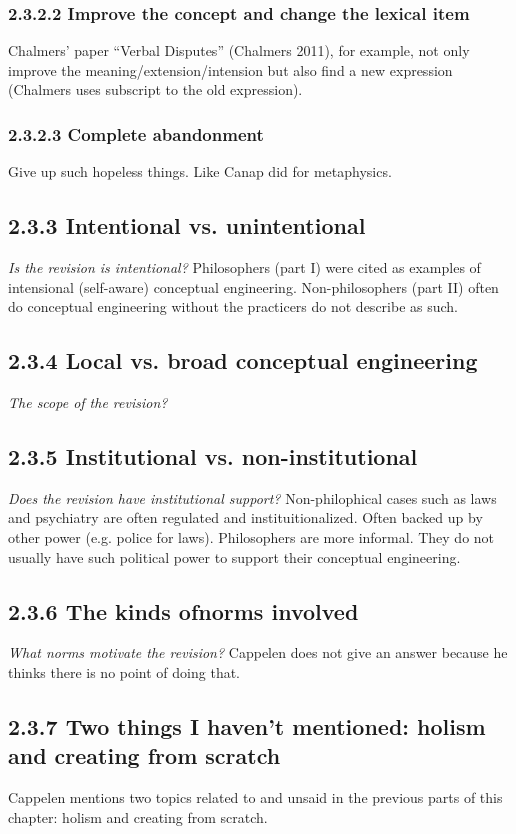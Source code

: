 \documentclass[
10pt, %
a4paper, %
twocolumn, %
landscape %
]{article}
\begin{document}
\subsubsection*{2.3.2.2 Improve the concept and change the lexical item}
Chalmers' paper ``Verbal Disputes'' (Chalmers 2011), for example, not only improve the meaning/extension/intension but also find a new expression (Chalmers uses subscript to the old expression).
\subsubsection*{2.3.2.3 Complete abandonment}
Give up such hopeless things. Like Canap did for metaphysics.

\subsection*{2.3.3 Intentional vs. unintentional}
\emph{Is the revision is intentional?}
Philosophers (part I) were cited as examples of intensional (self-aware) conceptual engineering. Non-philosophers (part II) often do conceptual engineering without the practicers do not describe as such.
\subsection*{2.3.4 Local vs. broad conceptual engineering}
\emph{The scope of the revision?}
\subsection*{2.3.5 Institutional vs. non-institutional}
\emph{Does the revision have institutional support?}
Non-philophical cases such as laws and psychiatry are often regulated and instituitionalized. Often backed up by other power (e.g. police for laws). Philosophers are more informal. They do not usually have such political power to support their conceptual engineering.
\subsection*{2.3.6 The kinds ofnorms involved}
\emph{What norms motivate the revision?}
Cappelen does not give an answer because he thinks there is no point of doing that.
\subsection*{2.3.7 Two things I haven't mentioned: holism and creating from scratch}
Cappelen mentions two topics related to and unsaid in the previous parts of this chapter: holism and creating from scratch.
\end{document}

